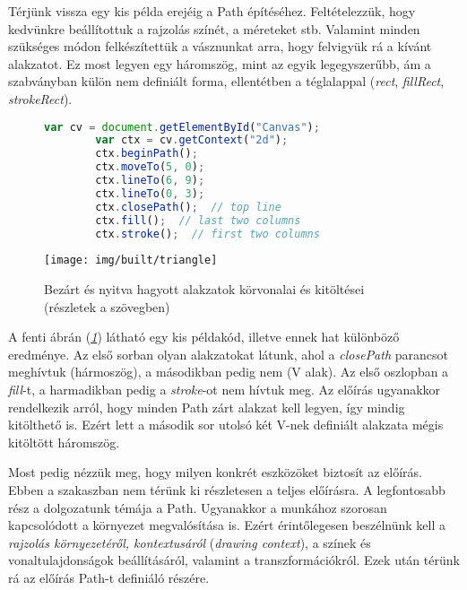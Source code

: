 \documentclass[12pt]{report}
\theoremstyle{definition}
\newcommand{\inenglish}[1]{\textsl{#1}}
\newcommand{\func}[1]{{\textsl{#1}}}
\begin{document}
Térjünk vissza egy kis példa erejéig a Path építéséhez. Feltételezzük, hogy
kedvünkre beállítottuk a rajzolás színét, a méreteket stb. Valamint minden
szükséges módon felkészítettük a vásznunkat arra, hogy felvigyük rá a kívánt
alakzatot. Ez most legyen egy háromszög, mint az egyik legegyszerűbb, ám a
szabványban külön nem definiált forma, ellentétben a téglalappal (\emph{rect},
\emph{fillRect}, \emph{strokeRect}).

  \begin{figure}[!htb]
    \hspace{0.05\textwidth}
      \centering
      \begin{lstlisting}[language=JavaScript, autogobble=true]
        var cv = document.getElementById("Canvas");
        var ctx = cv.getContext("2d");
        ctx.beginPath();
        ctx.moveTo(5, 0);
        ctx.lineTo(6, 9);
        ctx.lineTo(0, 3);
        ctx.closePath();  // top line
        ctx.fill();  // last two columns
        ctx.stroke();  // first two columns
      \end{lstlisting}
    \endminipage
      \centering
      \texttt{[image: img/built/triangle]}
    \endminipage
    \caption{\label{fig:triangles} Bezárt és nyitva hagyott
    alakzatok körvonalai és kitöltései \\ (részletek a szövegben)}
  \end{figure}

A fenti ábrán (\emph{\ref{fig:triangles}}) látható egy kis példakód,
illetve ennek hat különböző eredménye. Az első sorban olyan alakzatokat látunk,
ahol a \func{closePath} parancsot meghívtuk (hármoszög), a másodikban pedig nem
(V alak). Az első oszlopban a \func{fill}-t, a harmadikban pedig a
\func{stroke}-ot nem hívtuk meg. Az előírás ugyanakkor rendelkezik arról, hogy
minden Path zárt alakzat kell legyen, így mindig kitölthető is. Ezért lett a
második sor utolsó két V-nek definiált alakzata mégis kitöltött háromszög.

Most pedig nézzük meg, hogy milyen konkrét eszközöket biztosít az előírás.
Ebben a szakaszban nem térünk ki részletesen a teljes előírásra. A legfontosabb
rész a dolgozatunk témája a Path. Ugyanakkor a munkához szorosan kapcsolódott a
környezet megvalósítása is. Ezért érintőlegesen beszélnünk kell a
\emph{rajzolás környezetéről, kontextusáról} (\inenglish{drawing context}), a
színek és vonaltulajdonságok beállításáról, valamint a transzformációkról. Ezek
után térünk rá az előírás Path-t definiáló részére.
\end{document}
